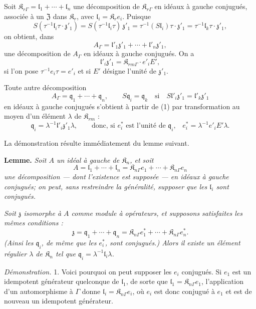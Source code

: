Soit \(\mathfrak K_{r\Gamma}=\mathfrak l_1+\cdots+\mathfrak l_n\) une décomposition de \(\mathfrak K_{r\Gamma}\) en idéaux à gauche conjugués, associée à un \(\mathfrak Z\) dans \(\mathfrak K_r\), avec \(\mathfrak l_i=\mathfrak K_r e_i\). Puisque
\[
S(\tau^{-1}\mathfrak l_i\tau\cdot\mathfrak z'_1)
=S(\tau^{-1}\mathfrak l_i\tau)\,\mathfrak z'_1
=\tau^{-1}(S\mathfrak l_i)\tau\cdot\mathfrak z'_1
=\tau^{-1}\mathfrak l_k\tau\cdot\mathfrak z'_1,
\]
on obtient, dans
\[
\tag{1}
A_\Gamma=\mathfrak l'_1\mathfrak z'_1+\cdots+\mathfrak l'_n\mathfrak z'_1,
\]
une décomposition de \(A_\Gamma\) en idéaux à gauche conjugués. On a
\[
\mathfrak l'_i\mathfrak z'_1=\mathfrak K_{rm\Gamma}\cdot e'_iE',
\]
si l'on pose \(\tau^{-1}e_i\tau=e'_i\) et si \(E'\) désigne l'unité de \(\mathfrak z'_1\).

Toute autre décomposition
\[
\tag{2}
A_\Gamma=\mathfrak q_1+\cdots+\mathfrak q_n,\qquad
S\mathfrak q_i=\mathfrak q_k\quad\text{si}\quad
S\mathfrak l'_i\mathfrak z'_1=\mathfrak l'_k\mathfrak z'_1
\]
en idéaux à gauche conjugués s'obtient à partir de (1) par transformation au moyen d'un élément \(\lambda\) de \(\mathfrak K_{rm}\) :
\[
\mathfrak q_i=\lambda^{-1}\mathfrak l'_i\mathfrak z'_1\lambda,
\qquad
\text{donc, si \(e_i^*\) est l'unité de \(\mathfrak q_i\),}\quad
e_i^*=\lambda^{-1}e'_iE'\lambda.
\]

La démonstration résulte immédiatement du lemme suivant.

\textbf{Lemme.} \emph{Soit \(A\) un idéal à gauche de \(\mathfrak K_n\), et soit}
\[
A=\mathfrak l_1+\cdots+\mathfrak l_n
=\mathfrak K_{n\Gamma}e_1+\cdots+\mathfrak K_{n\Gamma}e_n
\]
\emph{une décomposition --- dont l'existence est supposée --- en idéaux à gauche conjugués; on peut, sans restreindre la généralité, supposer que les \(\mathfrak l_i\) sont conjugués.}

\emph{Soit \(\mathfrak z\) isomorphe à \(A\) comme module à opérateurs, et supposons satisfaites les mêmes conditions :}
\[
\mathfrak z=\mathfrak q_1+\cdots+\mathfrak q_n
=\mathfrak K_{n\Gamma}e_1^*+\cdots+\mathfrak K_{n\Gamma}e_n^*.
\]
\emph{(Ainsi les \(\mathfrak q_i\), de même que les \(e_i^*\), sont conjugués.) Alors il existe un élément régulier \(\lambda\) de \(\mathfrak K_n\) tel que \(\mathfrak q_i=\lambda^{-1}\mathfrak l_i\lambda\).}

\emph{Démonstration.} 1. Voici pourquoi on peut supposer les \(e_i\) conjugués. Si \(e_1\) est un idempotent générateur quelconque de \(\mathfrak l_1\), de sorte que \(\mathfrak l_1=\mathfrak K_{n\Gamma}e_1\), l'application d'un automorphisme à \(\Gamma\) donne \(\mathfrak l_i=\mathfrak K_{n\Gamma}e_i\), où \(e_i\) est donc conjugué à \(e_1\) et est de nouveau un idempotent générateur.

